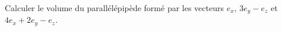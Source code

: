 
\begin{exercice}\label{exoOutilsMath-0073}

    Calculer le volume du parallélépipède formé par les vecteurs $e_x$, $3e_y-e_z$ et $4e_x+2e_y-e_z$.

\end{exercice}
